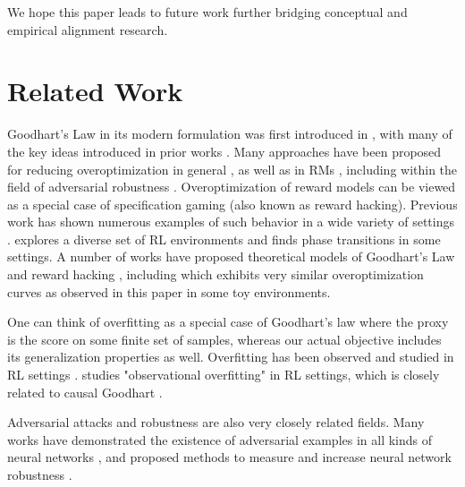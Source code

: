 \documentclass{article}
\theoremstyle{plain}
\begin{document}
We hope this paper leads to future work further bridging conceptual and empirical alignment research. 












\section{Related Work}\label{related_work}





%



Goodhart's Law in its modern formulation was first introduced in \citet{hoskin1996}, with many of the key ideas introduced in prior works \citep{campbell1969reforms,goodhart1975problems}. Many approaches have been proposed for reducing overoptimization in general \citep{taylor2016quantilizers,everitt2017reinforcement}, as well as in RMs \citep{gleave2022uncertainty}, including within the field of adversarial robustness \citep{chakraborty2018adversarial}. Overoptimization of reward models can be viewed as a special case of specification gaming (also known as reward hacking). Previous work has shown numerous examples of such behavior in a wide variety of settings \citep{specification-gaming,lehman2020surprising}. \citet{pan2022effects} explores a diverse set of RL environments and finds phase transitions in some settings.  A number of works have proposed theoretical models of Goodhart's Law and reward hacking \mbox{\citep{classifying-specification,manheim2018categorizing,https://doi.org/10.48550/arxiv.2209.13085}}, including \citet{zhuang2020consequences} which exhibits very similar overoptimization curves as observed in this paper in some toy environments. 

One can think of overfitting as a special case of Goodhart's law where the proxy is the score on some finite set of samples, whereas our actual objective includes its generalization properties as well. Overfitting has been observed and studied in RL settings \citep{zhang2018dissection,zhang2018study,farebrother2018generalization,pmlr-v97-cobbe19a}. \citet{song2019observational} studies "observational overfitting" in RL settings, which is closely related to causal Goodhart \citep{manheim2018categorizing}.


Adversarial attacks and robustness are also very closely related fields. Many works have demonstrated the existence of adversarial examples in all kinds of neural networks \citep{szegedy2013intriguing,https://doi.org/10.48550/arxiv.1703.06748,ebrahimi2018adversarial,pmlr-v80-dai18b}, and proposed methods to measure and increase neural network robustness \citep{gu2014towards,zheng2016improving,https://doi.org/10.48550/arxiv.1902.06705,https://doi.org/10.48550/arxiv.2104.13733}.
\end{document}
